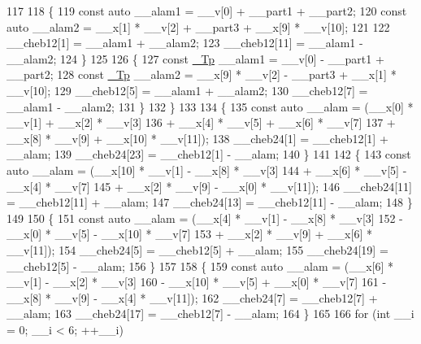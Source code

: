 \begin{DoxyCode}
117 
118         \{
119           \textcolor{keyword}{const} \textcolor{keyword}{auto} \_\_alam1 = \_\_v[0] + \_\_part1 + \_\_part2;
120           \textcolor{keyword}{const} \textcolor{keyword}{auto} \_\_alam2 = \_\_x[1] * \_\_v[2] + \_\_part3 + \_\_x[9] * \_\_v[10];
121 
122           \_\_cheb12[1] = \_\_alam1 + \_\_alam2;
123           \_\_cheb12[11] = \_\_alam1 - \_\_alam2;
124         \}
125 
126         \{
127           \textcolor{keyword}{const} \hyperlink{namespace____gnu__cxx_a3b19a9c800ca194374ef9172290f7d79}{\_Tp} \_\_alam1 = \_\_v[0] - \_\_part1 + \_\_part2;
128           \textcolor{keyword}{const} \hyperlink{namespace____gnu__cxx_a3b19a9c800ca194374ef9172290f7d79}{\_Tp} \_\_alam2 = \_\_x[9] * \_\_v[2] - \_\_part3 + \_\_x[1] * \_\_v[10];
129           \_\_cheb12[5] = \_\_alam1 + \_\_alam2;
130           \_\_cheb12[7] = \_\_alam1 - \_\_alam2;
131         \}
132       \}
133 
134       \{
135         \textcolor{keyword}{const} \textcolor{keyword}{auto} \_\_alam = (\_\_x[0] * \_\_v[1] + \_\_x[2] * \_\_v[3]
136                           + \_\_x[4] * \_\_v[5] + \_\_x[6] * \_\_v[7]
137                           + \_\_x[8] * \_\_v[9] + \_\_x[10] * \_\_v[11]);
138         \_\_cheb24[1] = \_\_cheb12[1] + \_\_alam;
139         \_\_cheb24[23] = \_\_cheb12[1] - \_\_alam;
140       \}
141 
142       \{
143         \textcolor{keyword}{const} \textcolor{keyword}{auto} \_\_alam = (\_\_x[10] * \_\_v[1] - \_\_x[8] * \_\_v[3]
144                           + \_\_x[6] * \_\_v[5] - \_\_x[4] * \_\_v[7]
145                           + \_\_x[2] * \_\_v[9] - \_\_x[0] * \_\_v[11]);
146         \_\_cheb24[11] = \_\_cheb12[11] + \_\_alam;
147         \_\_cheb24[13] = \_\_cheb12[11] - \_\_alam;
148       \}
149 
150       \{
151         \textcolor{keyword}{const} \textcolor{keyword}{auto} \_\_alam = (\_\_x[4] * \_\_v[1] - \_\_x[8] * \_\_v[3]
152                           - \_\_x[0] * \_\_v[5] - \_\_x[10] * \_\_v[7]
153                           + \_\_x[2] * \_\_v[9] + \_\_x[6] * \_\_v[11]);
154         \_\_cheb24[5] = \_\_cheb12[5] + \_\_alam;
155         \_\_cheb24[19] = \_\_cheb12[5] - \_\_alam;
156       \}
157 
158       \{
159         \textcolor{keyword}{const} \textcolor{keyword}{auto} \_\_alam = (\_\_x[6] * \_\_v[1] - \_\_x[2] * \_\_v[3]
160                           - \_\_x[10] * \_\_v[5] + \_\_x[0] * \_\_v[7]
161                           - \_\_x[8] * \_\_v[9] - \_\_x[4] * \_\_v[11]);
162         \_\_cheb24[7] = \_\_cheb12[7] + \_\_alam;
163         \_\_cheb24[17] = \_\_cheb12[7] - \_\_alam;
164       \}
165 
166       \textcolor{keywordflow}{for} (\textcolor{keywordtype}{int} \_\_i = 0; \_\_i < 6; ++\_\_i)

\end{DoxyCode}
